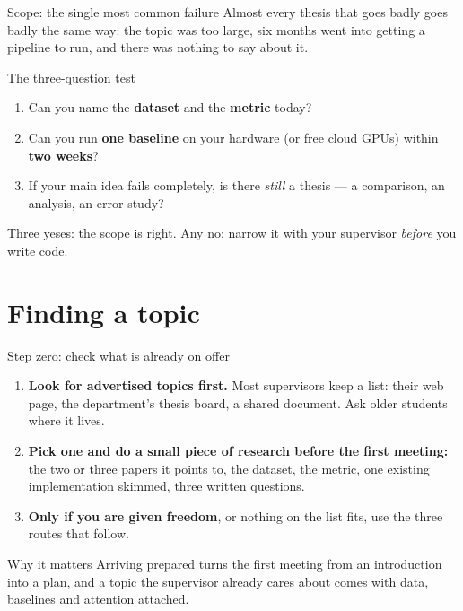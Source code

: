 \documentclass[aspectratio=169,11pt]{beamer}
\newcommand{\key}[1]{\textbf{\color{brand}#1}}
\begin{document}
\begin{frame}{Scope: the single most common failure}
Almost every thesis that goes badly goes badly the same way: the topic was too
large, six months went into getting a pipeline to run, and there was nothing to
say about it.

\vspace{4mm}
\begin{block}{The three-question test}
\begin{enumerate}
  \item Can you name the \key{dataset} and the \key{metric} today?
  \item Can you run \key{one baseline} on your hardware (or free cloud GPUs)
        within \key{two weeks}?
  \item If your main idea fails completely, is there \emph{still} a thesis ---
        a comparison, an analysis, an error study?
\end{enumerate}
\end{block}
\vspace{2mm}
\centering
Three yeses: the scope is right. Any no: narrow it with your supervisor
\emph{before} you write code.
\end{frame}

\section{Finding a topic}

\begin{frame}{Step zero: check what is already on offer}
\begin{enumerate}
  \item \key{Look for advertised topics first.} Most supervisors keep a list:
        their web page, the department's thesis board, a shared document. Ask
        older students where it lives.
  \item \key{Pick one and do a small piece of research before the first
        meeting:} the two or three papers it points to, the dataset, the
        metric, one existing implementation skimmed, three written questions.
  \item \key{Only if you are given freedom}, or nothing on the list fits, use
        the three routes that follow.
\end{enumerate}
\vspace{3mm}
\begin{block}{Why it matters}
\footnotesize
Arriving prepared turns the first meeting from an introduction into a plan,
and a topic the supervisor already cares about comes with data, baselines and
attention attached.
\end{block}
\end{frame}
\end{document}
